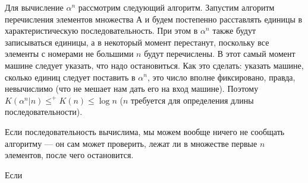 Для вычисление $\alpha^n$ рассмотрим следующий алгоритм. Запустим алгоритм перечисления элементов множества А и будем постепенно расставлять единицы в характеристическую последовательность. При этом в $\alpha^n$ также будут записываться единицы, а в некоторый момент перестанут, поскольку все элементы с номерами не большими $n$ будут перечислены. В этот самый момент машине следует указать, что надо остановиться. Как это сделать: указать машине, сколько единиц следует поставить в $\alpha^n$, это число вполне фиксировано, правда, невычислимо (что не мешает нам дать его на вход машине). Поэтому $K(\alpha^n|n)\le^+K(n)\le \log n$ ($n$ требуется для определения длины последовательности).

Если последовательность вычислима, мы можем вообще ничего не сообщать алгоритму --- он сам может проверить, лежат ли в множестве первые $n$ элементов, после чего остановится.

Если 

